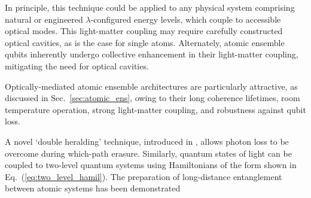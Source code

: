 In principle, this technique could be applied to any physical system comprising natural or engineered $\lambda$-configured energy levels, which couple to accessible optical modes. This light-matter coupling may require carefully constructed optical cavities, as is the case for single atoms. Alternately, atomic ensemble qubits inherently undergo collective enhancement in their light-matter coupling, mitigating the need for optical cavities.

Optically-mediated atomic ensemble architectures are particularly attractive, as discussed in Sec.~\ref{sec:atomic_ens}, owing to their long coherence lifetimes, room temperature operation, strong light-matter coupling, and robustness against qubit loss.

A novel `double heralding' technique, introduced in \cite{bib:BarrettKok05}, allows photon loss to be overcome during which-path erasure. Similarly, quantum states of light can be coupled to two-level quantum systems using Hamiltonians of the form shown in Eq.~(\ref{eq:two_level_hamil}). The preparation of long-distance entanglement between atomic systems has been demonstrated \cite{bib:Matsukevich05, bib:Matsukevich05b}

